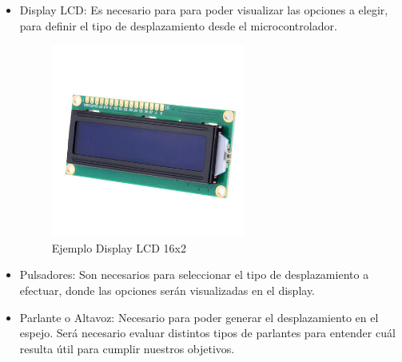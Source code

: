 \begin{itemize}
\item Display LCD: Es necesario para para poder visualizar las opciones a elegir, para  definir el tipo de desplazamiento desde el microcontrolador.
\begin{figure}[H]
  \centering
  \includegraphics[width=0.6\textwidth]{images/displayLCD.jpg}
  \caption{Ejemplo Display LCD 16x2}
  \label{fig:display}
\end{figure}
\item Pulsadores: Son necesarios para seleccionar el tipo de desplazamiento a efectuar, donde las opciones serán visualizadas en el display.
\item Parlante o Altavoz: Necesario para poder generar el desplazamiento en el espejo. Será necesario evaluar distintos tipos de parlantes para entender cuál resulta útil para cumplir nuestros objetivos.
\end{itemize}
